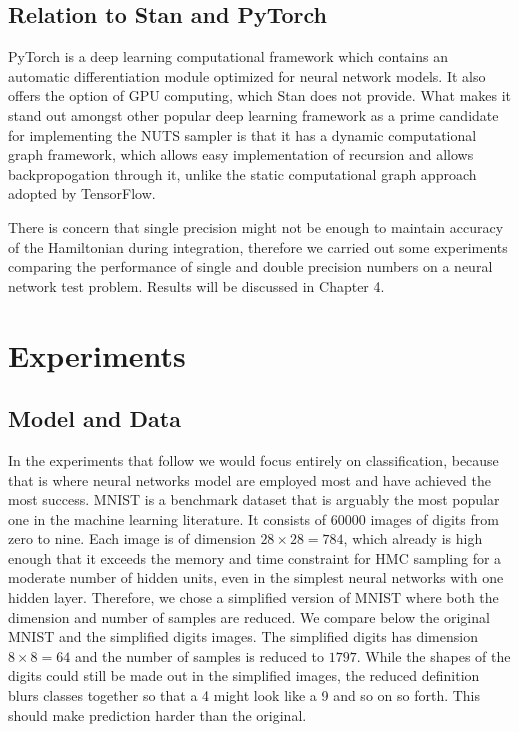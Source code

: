 \documentclass[12pt]{report}
\begin{document}
\section{Relation to Stan and PyTorch}

PyTorch \cite{paszke2017automatic} is a deep learning computational framework which contains an automatic differentiation module optimized for neural network models. It also offers the option of GPU computing, which Stan does not provide. What makes it stand out amongst other popular deep learning framework as a prime candidate for implementing the NUTS sampler is that it has a dynamic computational graph framework, which allows easy implementation of recursion and allows backpropogation through it, unlike the static computational graph approach adopted by TensorFlow.

There is concern that single precision might not be enough to maintain accuracy of the Hamiltonian during integration, therefore we carried out some experiments comparing the performance of single and double precision numbers on a neural network test problem. Results will be discussed in Chapter 4.


\chapter{Experiments}
\section{Model and Data}

In the experiments that follow we would focus entirely on classification, because that is where neural networks model are employed most and have achieved the most success. MNIST \cite{lecun-mnisthandwrittendigit-2010} is a benchmark dataset that is arguably the most popular one in the machine learning literature. It consists of 60000 images of digits from zero to nine. Each image is of dimension $ 28 \times 28 = 784 $, which already is high enough that it exceeds the memory and time constraint for HMC sampling for a moderate number of hidden units, even in the simplest neural networks with one hidden layer. Therefore, we chose a simplified version of MNIST where both the dimension and number of samples are reduced. We compare below the original MNIST and the simplified digits images. The simplified digits has dimension $8 \times 8 = 64 $ and the number of samples is reduced to $1797$. While the shapes of the digits could still be made out in the simplified images, the reduced definition blurs classes together so that a 4 might look like a 9 and so on so forth. This should make prediction harder than the original.
\end{document}
